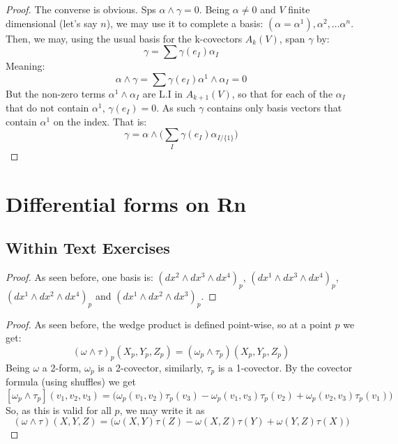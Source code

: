 \begin{problem}
\end{problem}

\begin{proof}
	The converse is obvious. Sps $\alpha \wedge \gamma = 0$. Being $\alpha \neq 0$ and $V$ finite dimensional (let's say $n$), we may use it to complete a basis:
	$(\alpha = \alpha^1), \alpha^2, \dots \alpha^n$. Then, we may, using the usual basis for the k-covectors $A_k(V)$, span $\gamma$ by:
	$$\gamma = \sum \gamma(e_I)\alpha_I$$
	Meaning:
	$$\alpha \wedge \gamma = \sum \gamma(e_I) \alpha^1 \wedge \alpha_I = 0$$
	But the non-zero terms $\alpha^1 \wedge \alpha_I$ are L.I in $A_{k+1}(V)$, so that for each of the $\alpha_I$ that do not contain
	$\alpha^1$, $\gamma(e_I) = 0$. As such $\gamma$ contains only basis vectors that contain $\alpha^1$ on the index. That is:
	$$\gamma = \alpha \wedge \Bigg( \sum_{I} \gamma(e_I) \alpha_{I / \{ 1\}} \Bigg)$$
\end{proof}

\section{Differential forms on Rn}

\subsection{Within Text Exercises}

\begin{customprob}{4.3}
\end{customprob}
\begin{proof}
	As seen before, one basis is: $(dx^2 \wedge dx^3 \wedge dx^4)_p$, $(dx^1 \wedge dx^3 \wedge dx^4)_p$, $(dx^1 \wedge dx^2 \wedge dx^4)_p$ and
	$(dx^1 \wedge dx^2 \wedge dx^3)_p$.
\end{proof}

\begin{customprob}{4.4}
\end{customprob}

\begin{proof}
	As seen before, the wedge product is defined point-wise, so at a point $p$ we get:
	$$(\omega \wedge \tau)_p(X_p,Y_p,Z_p) = (\omega_p \wedge \tau_p)(X_p,Y_p,Z_p)$$
	Being $\omega$ a 2-form, $\omega_p$ is a 2-covector, similarly, $\tau_p$ is a 1-covector. By the covector formula (using shuffles) we get
	$$[\omega_p \wedge \tau_p](v_1, v_2, v_3) = \bigg(\omega_p(v_1, v_2)\tau_p(v_3) - \omega_p(v_1, v_3)\tau_p(v_2) + \omega_p(v_2, v_3)\tau_p(v_1) \bigg)$$
	So, as this is valid for all $p$, we may write it as
	$$(\omega \wedge \tau)(X,Y,Z) = \bigg(\omega(X, Y)\tau(Z) - \omega(X, Z)\tau(Y) + \omega(Y, Z)\tau(X) \bigg)$$
\end{proof}


